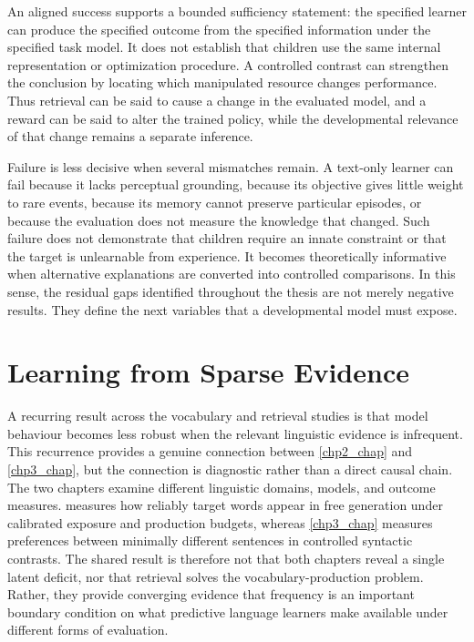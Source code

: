 An aligned success supports a bounded sufficiency statement: the specified learner can produce the specified outcome from the specified information under the specified task model. It does not establish that children use the same internal representation or optimization procedure. A controlled contrast can strengthen the conclusion by locating which manipulated resource changes performance. Thus retrieval can be said to cause a change in the evaluated model, and a reward can be said to alter the trained policy, while the developmental relevance of that change remains a separate inference.

Failure is less decisive when several mismatches remain. A text-only learner can fail because it lacks perceptual grounding, because its objective gives little weight to rare events, because its memory cannot preserve particular episodes, or because the evaluation does not measure the knowledge that changed. Such failure does not demonstrate that children require an innate constraint or that the target is unlearnable from experience. It becomes theoretically informative when alternative explanations are converted into controlled comparisons. In this sense, the residual gaps identified throughout the thesis are not merely negative results. They define the next variables that a developmental model must expose.

\section{Learning from Sparse Evidence}
\label{sec:gd_sparse_evidence}

A recurring result across the vocabulary and retrieval studies is that model behaviour becomes less robust when the relevant linguistic evidence is infrequent. This recurrence provides a genuine connection between \cref{chp2_chap} and \cref{chp3_chap}, but the connection is diagnostic rather than a direct causal chain. The two chapters examine different linguistic domains, models, and outcome measures.  measures how reliably target words appear in free generation under calibrated exposure and production budgets, whereas \cref{chp3_chap} measures preferences between minimally different sentences in controlled syntactic contrasts. The shared result is therefore not that both chapters reveal a single latent deficit, nor that retrieval solves the vocabulary-production problem. Rather, they provide converging evidence that frequency is an important boundary condition on what predictive language learners make available under different forms of evaluation.


